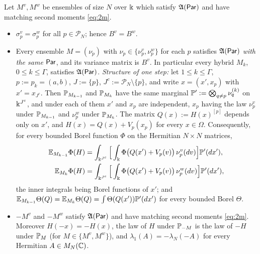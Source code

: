 \begin{lemma}\label{lem:hyb}
Let $M^v,M^w$ be ensembles of size $N$ over $\K$ which satisfy $\fA(\Par)$ and have matching second moments \eqref{eq:2m}.
\begin{itemize}\itemsep1pt
\item[\textup{(i)}] $\sigma^v_p=\sigma^w_p$ for all $p\in\mathcal P_N$; hence $B^v=B^w$.
\item[\textup{(ii)}] Every ensemble $M=(\nu_p)$ with $\nu_p\in\{\nu^v_p,\nu^w_p\}$ for each $p$ satisfies $\fA(\Par)$ \emph{with the same} $\Par$, and its variance
matrix is $B^v$. In particular every hybrid $M_k$, $0\le k\le\Gamma$, satisfies $\fA(\Par)$.
\emph{Structure of one step:} let $1\le k\le\Gamma$, $p:=p_k=(a,b)$, $J:=\{p\}$, $J^c:=\mathcal P_N\setminus\{p\}$, and write $x=(x',x_p)$ with $x'=x_{J^c}$. Then
$\P_{M_{k-1}}$ and $\P_{M_k}$ have the same marginal $\P':=\bigotimes_{q\ne p}\nu^{(k)}_q$ on $\K^{J^c}$, and under each of them $x'$ and $x_p$ are independent,
$x_p$ having the law $\nu^v_p$ under $\P_{M_{k-1}}$ and $\nu^w_p$ under $\P_{M_k}$. The matrix $Q(x):=H(x)^{[p]}$ depends only on $x'$, and
$H(x)=Q(x)+V_p(x_p)$ for every $x\in\Omega$. Consequently, for every bounded Borel function $\Phi$ on the Hermitian $N\times N$ matrices,
\begin{equation}\label{eq:B2step}
\begin{aligned}
\E_{M_{k-1}}\Phi(H)&=\int_{\K^{J^c}}\Big[\int_\K\Phi\big(Q(x')+V_p(v)\big)\,\nu^v_p(dv)\Big]\P'(dx'),\\
\E_{M_{k}}\Phi(H)&=\int_{\K^{J^c}}\Big[\int_\K\Phi\big(Q(x')+V_p(v)\big)\,\nu^w_p(dv)\Big]\P'(dx'),
\end{aligned}
\end{equation}
the inner integrals being Borel functions of $x'$; and $\E_{M_{k-1}}\Theta(Q)=\E_{M_k}\Theta(Q)=\int\Theta(Q(x'))\P'(dx')$ for every bounded Borel $\Theta$.
\item[\textup{(iii)}] $-M^v$ and $-M^w$ satisfy $\fA(\Par)$ and have matching second moments \eqref{eq:2m}. Moreover $H(-x)=-H(x)$, the law of $H$ under $\P_{-M}$ is the
law of $-H$ under $\P_M$ (for $M\in\{M^v,M^w\}$), and $\lambda_1(A)=-\lambda_N(-A)$ for every Hermitian $A\in M_N(\C)$.
\end{itemize}
\end{lemma}
